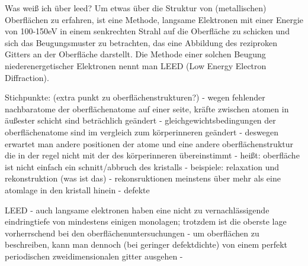 Was weiß ich über leed?
Um etwas über die Struktur von (metallischen) Oberflächen zu erfahren, ist eine Methode, langsame Elektronen
mit einer Energie von 100-150eV in einem senkrechten Strahl auf die Oberfläche zu schicken und sich das
Beugungsmuster zu betrachten, das eine Abbildung des reziproken Gitters an der Oberfläche darstellt. Die
Methode einer solchen Beugung niederenergetischer Elektronen nennt man LEED (Low Energy Electron Diffraction).
 

 Stichpunkte:
 (extra punkt zu oberflächenstrukturen?)
 - wegen fehlender nachbaratome der oberflächenatome auf einer seite, kräfte zwischen atomen in äußester
 schicht sind beträchlich geändert
 - gleichgewichtsbedingungen der oberflächenatome sind im vergleich zum körperinneren geändert
 - deswegen erwartet man andere positionen der atome und eine andere oberflächenstruktur die in der regel
 nicht mit der des körperinneren übereinstimmt
 - heißt: oberfläche ist nicht einfach ein schnitt/abbruch des kristalls
 - beispiele: relaxation und rekonstruktion (was ist das)
 - rekonsruktionen meinstens über mehr als eine atomlage in den kristall hinein 
 - defekte
 
 LEED
 -  auch langsame elektronen haben eine nicht zu vernachlässigende eindringtiefe von mindestens einigen
 monolagen; trotzdem ist die oberste lage vorherrschend bei den oberflächenuntersuchungen
 - um oberflächen zu beschreiben, kann man dennoch (bei geringer defektdichte) von einem perfekt periodischen
 zweidimensionalen gitter ausgehen
 - 
 
 
